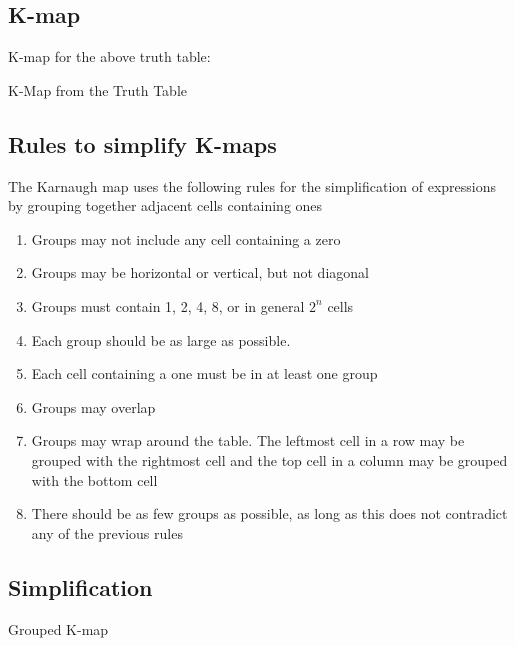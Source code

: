 \documentclass[journal,12pt,twocolumn]{IEEEtran}
\begin{document}
\subsection{K-map}
K-map for the above truth table:\\
\begin{table}[h]

\centering
\begin{kvmap}
\end{kvmap}
\vspace{4pt}
\caption{K-Map from the Truth Table}
    \label{kmap}
\end{table}

\subsection{Rules to simplify K-maps}
The Karnaugh map uses the following rules for the simplification of expressions by grouping together adjacent cells containing ones
\vspace{4pt}
\begin{enumerate}[itemsep=5pt]
    \item Groups may not include any cell containing a zero
    \item Groups may be horizontal or vertical, but not diagonal
    \item Groups must contain 1, 2, 4, 8, or in general $2^n$ cells
    \item Each group should be as large as possible.
    \item Each cell containing a one must be in at least one group
    \item Groups may overlap
    \item Groups may wrap around the table. The leftmost cell in a row may be grouped with the rightmost cell and the top cell in a column may be grouped with the bottom cell 
    \item There should be as few groups as possible, as long as this does not contradict any of the previous rules
\end{enumerate}


\subsection{Simplification}
\begin{table}[h]

\centering
\begin{kvmap}
\end{kvmap}
\vspace{4pt}
\caption{Grouped K-map}
    \label{kmap_grouped}
\end{table}
\end{document}
